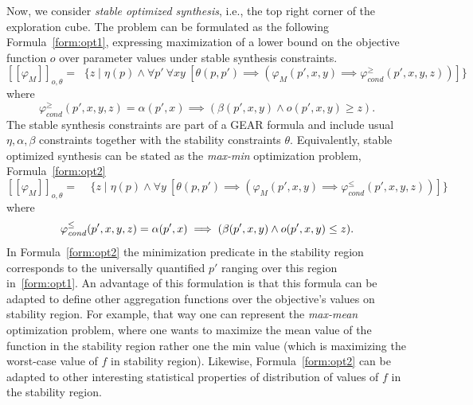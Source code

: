 \documentclass[a4paper,parskip=half]{article} %
\newcommand*\eqdef=
\newcommand*\regmax[2]{[[{#1}]]_{#2}}
\newcommand*\objv{o}
\newcommand*\todofb[2][]{\todo[color=cyan!30,tickmarkheight=.2em,size=\scriptsize,#1]{FB: #2}}
\begin{document}
Now, we consider \emph{stable optimized synthesis}, i.e., the top right corner of the exploration cube.
The problem can be formulated as the following Formula~\eqref{form:opt1}, expressing maximization of a lower bound  on the objective function $\objv$ over parameter values under stable synthesis constraints.
%
\begin{equation}\label{form:opt1}
\regmax{\varphi_M}{\objv,\theta}
\eqdef\mathop{\max\limits_{p}} \{z \mid\eta(p) \wedge
    \forall p'~
    \forall x y~[
    \theta(p,p') \implies
    (\varphi_M(p',x,y)  \implies 
     \varphi_{\mathit{cond}}^{\geq}(p',x,y,z))
    ]\}
\end{equation}
where
\[
\varphi_{\mathit{cond}}^{\geq}(p',x,y,z)
\eqdef \alpha(p',x) \implies (\beta(p',x,y) \wedge \objv(p',x,y) \geq z).
\]
%
The stable synthesis constraints are part of a GEAR formula and include usual $\eta, \alpha, \beta$ constraints together with the stability constraints $\theta$.
%
%
Equivalently, stable optimized synthesis can be stated as the \emph{max-min} optimization problem, Formula~\eqref{form:opt2}
\begin{equation}\label{form:opt2}
\regmax{\varphi_M}{\objv,\theta}
\eqdef
\mathop{\max\limits_{p}} \mathop{\min\limits_{x, p'}}
\{ z \mid \eta(p) \wedge
    \forall y~[
     \theta(p,p') \implies
     (\varphi_M(p',x,y)  \implies  \varphi_{\mathit{cond}}^{\leq}(p',x,y,z))]\}
\end{equation}
%
%
where \[
\varphi_{\mathit{cond}}^{\leq}(p',x,y,z)
\eqdef\alpha(p',x) \implies (\beta(p',x,y) \wedge \objv(p',x,y) \leq z)\text.\]
In Formula~\eqref{form:opt2} the minimization predicate in the stability region corresponds to the universally quantified $p'$ ranging over this region in~\eqref{form:opt1}.
An advantage of this formulation is that this formula can be adapted to define other aggregation functions over the objective's values on stability region.
For example, that way one can represent the \emph{max-mean} optimization problem, where one wants to maximize the mean value of the function in the stability region rather one the min value (which is maximizing the worst-case value of $f$ in stability region).
Likewise, Formula~\eqref{form:opt2} can be adapted to other interesting statistical properties of distribution of values of $f$ in the stability region.%
\end{document}
